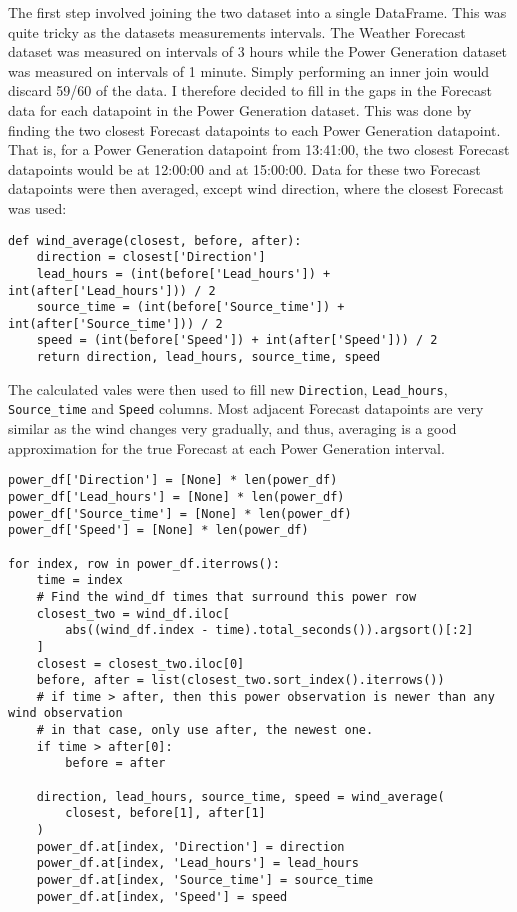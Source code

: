 The first step involved joining the two dataset into a single DataFrame. This was quite tricky as the datasets measurements intervals. The Weather Forecast dataset was measured on intervals of 3 hours while the Power Generation dataset was measured on intervals of 1 minute. Simply performing an inner join would discard 59/60 of the data. I therefore decided to fill in the gaps in the Forecast data for each datapoint in the Power Generation dataset. This was done by finding the two closest Forecast datapoints to each Power Generation datapoint. That is, for a Power Generation datapoint from 13:41:00, the two closest Forecast datapoints would be at 12:00:00 and at 15:00:00. Data for these two Forecast datapoints were then averaged, except wind direction, where the closest Forecast was used:

\begin{verbatim}
def wind_average(closest, before, after):
    direction = closest['Direction']
    lead_hours = (int(before['Lead_hours']) + int(after['Lead_hours'])) / 2
    source_time = (int(before['Source_time']) + int(after['Source_time'])) / 2
    speed = (int(before['Speed']) + int(after['Speed'])) / 2
    return direction, lead_hours, source_time, speed
\end{verbatim}

The calculated vales were then used to fill new \texttt{Direction}, \texttt{Lead\_hours}, \texttt{Source\_time} and \texttt{Speed} columns. Most adjacent Forecast datapoints are very similar as the wind changes very gradually, and thus, averaging is a good approximation for the true Forecast at each Power Generation interval.

\begin{verbatim}
power_df['Direction'] = [None] * len(power_df)
power_df['Lead_hours'] = [None] * len(power_df)
power_df['Source_time'] = [None] * len(power_df)
power_df['Speed'] = [None] * len(power_df)

for index, row in power_df.iterrows():
    time = index
    # Find the wind_df times that surround this power row
    closest_two = wind_df.iloc[
        abs((wind_df.index - time).total_seconds()).argsort()[:2]
    ]
    closest = closest_two.iloc[0]
    before, after = list(closest_two.sort_index().iterrows())
    # if time > after, then this power observation is newer than any wind observation
    # in that case, only use after, the newest one.
    if time > after[0]:
        before = after

    direction, lead_hours, source_time, speed = wind_average(
        closest, before[1], after[1]
    )
    power_df.at[index, 'Direction'] = direction
    power_df.at[index, 'Lead_hours'] = lead_hours
    power_df.at[index, 'Source_time'] = source_time
    power_df.at[index, 'Speed'] = speed
\end{verbatim}

